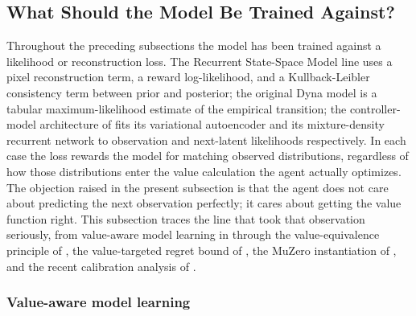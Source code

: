 \subsection{What Should the Model Be Trained Against?}
\label{section:fc_value_aware}

Throughout the preceding subsections the model has been trained against a likelihood or reconstruction loss. The Recurrent State-Space Model line uses a pixel reconstruction term, a reward log-likelihood, and a Kullback-Leibler consistency term between prior and posterior; the original Dyna model is a tabular maximum-likelihood estimate of the empirical transition; the controller-model architecture of \citet{HaSchmidhuber2018} fits its variational autoencoder and its mixture-density recurrent network to observation and next-latent likelihoods respectively. In each case the loss rewards the model for matching observed distributions, regardless of how those distributions enter the value calculation the agent actually optimizes. The objection raised in the present subsection is that the agent does not care about predicting the next observation perfectly; it cares about getting the value function right. This subsection traces the line that took that observation seriously, from value-aware model learning in \citet{FarahmandVAML2017} through the value-equivalence principle of \citet{GrimmVALEQ2020,GrimmPVE2021}, the value-targeted regret bound of \citet{AyoubVTR2020}, the MuZero instantiation of \citet{Schrittwieser2020MuZero}, and the recent calibration analysis of \citet{VoelckerCalib2025}.

\subsubsection{Value-aware model learning}
\label{section:fc_value_aware_vaml}

